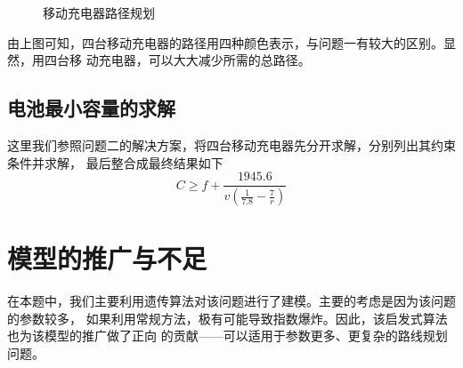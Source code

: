 \documentclass{ctexart}
\begin{document}
\begin{figure}[H]
        
        \centering
        \caption{移动充电器路径规划}
    \end{figure}
    由上图可知，四台移动充电器的路径用四种颜色表示，与问题一有较大的区别。显然，用四台移
    动充电器，可以大大减少所需的总路径。
    
    \subsection{电池最小容量的求解}
    这里我们参照问题二的解决方案，将四台移动充电器先分开求解，分别列出其约束条件并求解，
    最后整合成最终结果如下
    \begin{equation}
        C\geq f+\frac{1945.6}{v(\frac{1}{7.8}-\frac{7}{r})}
    \end{equation}

    \section{模型的推广与不足}
    在本题中，我们主要利用遗传算法对该问题进行了建模。主要的考虑是因为该问题的参数较多，
    如果利用常规方法，极有可能导致指数爆炸。因此，该启发式算法也为该模型的推广做了正向
    的贡献——可以适用于参数更多、更复杂的路线规划问题。
\end{document}
